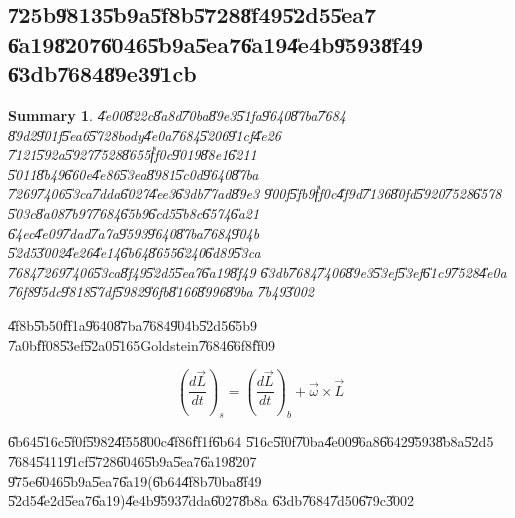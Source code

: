 \documentclass[12pt]{article}
\newtheorem{summary}[theorem]{Summary}
\begin{document}
\subsection{\U{725b}\U{9813}\U{5b9a}\U{5f8b}\U{5728}\U{8f49}\U{52d5}\U{5ea7}%
\U{6a19}\U{8207}\U{6046}\U{5b9a}\U{5ea7}\U{6a19}\U{4e4b}\U{9593}\U{8f49}%
\U{63db}\U{7684}\U{89e3}\U{91cb}}

\begin{summary}
\U{4e00}\U{822c}\U{8a8d}\U{70ba}\U{89e3}\U{51fa}\U{9640}\U{87ba}\U{7684}%
\U{89d2}\U{901f}\U{5ea6}\U{5728}body\U{4e0a}\U{7684}\U{5206}\U{91cf}\U{4e26}%
\U{7121}\U{592a}\U{5927}\U{7528}\U{8655}\U{ff0c}\U{9019}\U{88e1}\U{6211}%
\U{5011}\U{8b49}\U{660e}\U{4e86}\U{53ea}\U{8981}\U{5c0d}\U{9640}\U{87ba}%
\U{7269}\U{7406}\U{53ca}\U{7dda}\U{6027}\U{4ee3}\U{63db}\U{77ad}\U{89e3}%
\U{900f}\U{5fb9}\U{ff0c}\U{4f9d}\U{7136}\U{80fd}\U{5920}\U{7528}\U{6578}%
\U{503c}\U{8a08}\U{7b97}\U{7684}\U{65b9}\U{6cd5}\U{5b8c}\U{6574}\U{6a21}%
\U{64ec}\U{4e09}\U{7dad}\U{7a7a}\U{9593}\U{9640}\U{87ba}\U{7684}\U{904b}%
\U{52d5}\U{3002}\U{4e26}\U{4e14}\U{6b64}\U{8655}\U{6240}\U{6d89}\U{53ca}%
\U{7684}\U{7269}\U{7406}\U{53ca}\U{8f49}\U{52d5}\U{5ea7}\U{6a19}\U{8f49}%
\U{63db}\U{7684}\U{7406}\U{89e3}\U{53ef}\U{53ef}\U{61c9}\U{7528}\U{4e0a}%
\U{76f8}\U{95dc}\U{9818}\U{57df}\U{5982}\U{96fb}\U{8166}\U{8996}\U{89ba}%
\U{7b49}\U{3002}
\end{summary}

\U{4f8b}\U{5b50}\U{ff1a}\U{9640}\U{87ba}\U{7684}\U{904b}\U{52d5}\U{65b9}%
\U{7a0b}\U{ff08}\U{53ef}\U{52a0}\U{5165}Goldstein\U{7684}\U{66f8}\U{ff09}

\begin{equation}
\left( \frac{d\vec{L}}{dt}\right) _{s}=\left( \frac{d\vec{L}}{dt}\right)
_{b}+\vec{\omega}\times \vec{L}
\end{equation}

\U{6b64}\U{516c}\U{5f0f}\U{5982}\U{4f55}\U{800c}\U{4f86}\U{ff1f}\U{6b64}%
\U{516c}\U{5f0f}\U{70ba}\U{4e00}\U{96a8}\U{6642}\U{9593}\U{8b8a}\U{52d5}%
\U{7684}\U{5411}\U{91cf}\U{5728}\U{6046}\U{5b9a}\U{5ea7}\U{6a19}\U{8207}%
\U{975e}\U{6046}\U{5b9a}\U{5ea7}\U{6a19}(\U{6b64}\U{4f8b}\U{70ba}\U{8f49}%
\U{52d5}\U{4e2d}\U{5ea7}\U{6a19})\U{4e4b}\U{9593}\U{7dda}\U{6027}\U{8b8a}%
\U{63db}\U{7684}\U{7d50}\U{679c}\U{3002}

\bigskip
\end{document}

